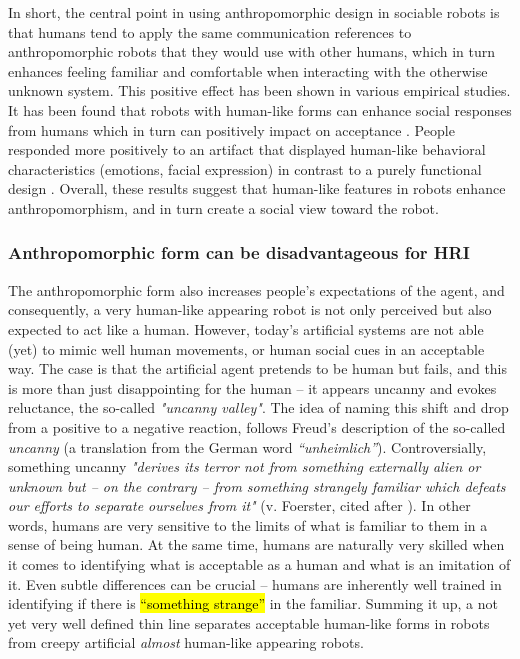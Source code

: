 \documentclass{frontiersSCNS} %
\begin{document}
In short, the central point in using anthropomorphic design in sociable robots is that 
humans tend to apply the same communication references to anthropomorphic robots 
that they would use with other humans, which in turn enhances feeling familiar and 
comfortable when interacting with the otherwise unknown system.
This positive effect has been shown in various 
empirical studies. It has been found that robots with human-like forms can enhance social 
responses from humans which in turn can positively impact on acceptance 
\citep{duffy_anthropomorphism_2003,goetz_cooperation_2002,venkatesh_theoretical_2000}. 
People responded more positively to an artifact that displayed human-like 
behavioral characteristics (emotions, facial expression) in contrast to a purely 
functional design 
\citep{eyssel_anthropomorphic_2010,krach_can_2008,reeves_media_1996,riek_how_2009}. 
Overall, these results suggest that human-like features in robots enhance 
anthropomorphism, and in turn create a social view toward the robot.

 


\subsubsection{Anthropomorphic form can be disadvantageous for HRI\\}

The anthropomorphic form also 
increases people's expectations of the agent, and consequently, a very human-like 
appearing robot is not only perceived but also expected to act like a human. However, today's artificial systems are 
not able (yet) to mimic well human movements, or human social cues in an acceptable way. 
The case is that the artificial agent pretends to be human but fails, and this is 
more than just disappointing for the 
human -- it appears uncanny and evokes reluctance, the so-called 
\textit{"uncanny valley"}. The idea of naming this shift and drop from a positive to a negative reaction,
follows Freud's description of the so-called \textit{uncanny} (a translation from the German word 
\textit{``unheimlich''}). Controversially, something uncanny \textit{"derives its terror not from 
something externally alien or unknown but -- on the contrary -- from something 
strangely familiar which defeats our efforts to separate ourselves from it"} (v. Foerster, cited after \cite{hegel_understanding_2008}).
In other words, humans are very sensitive to the limits of what is familiar to them 
in a sense of being human. At the same time, humans are naturally very skilled when 
it comes to identifying what is acceptable as a human and what is an imitation 
of it. Even subtle differences can be crucial -- humans are inherently well trained 
in identifying if there is \hl{``something strange''} in the familiar.
Summing it up, a not yet very well defined thin line separates acceptable human-like forms in 
robots from creepy artificial \textit{almost} human-like appearing robots.
\end{document}
